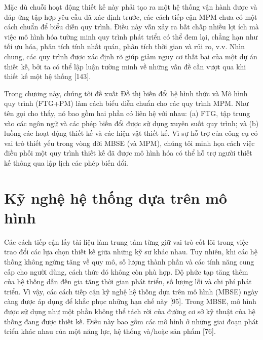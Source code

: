 Mặc dù chuỗi hoạt động thiết kế này phải tạo ra một hệ thống vận hành được và đáp ứng tập hợp yêu cầu đã xác định trước, các cách tiếp cận MPM chưa có một cách chuẩn để biểu diễn quy trình. Điều này vẫn xảy ra bất chấp nhiều lợi ích mà việc mô hình hóa tường minh quy trình phát triển có thể đem lại, chẳng hạn như tối ưu hóa, phân tích tính nhất quán, phân tích thời gian và rủi ro, v.v. Nhìn chung, các quy trình được xác định rõ giúp giảm nguy cơ thất bại của một dự án thiết kế, bởi ta có thể lập luận tường minh về những vấn đề cần vượt qua khi thiết kế một hệ thống [143].

Trong chương này, chúng tôi đề xuất Đồ thị biến đổi hệ hình thức và Mô hình quy trình (FTG+PM) làm cách biểu diễn chuẩn cho các quy trình MPM. Như tên gọi cho thấy, nó bao gồm hai phần có liên hệ với nhau: (a) FTG, tập trung vào các ngôn ngữ và các phép biến đổi được sử dụng xuyên suốt quy trình; và (b) luồng các hoạt động thiết kế và các hiện vật thiết kế. Vì sự hỗ trợ của công cụ có vai trò thiết yếu trong vòng đời MBSE (và MPM), chúng tôi minh họa cách việc điều phối một quy trình thiết kế đã được mô hình hóa có thể hỗ trợ người thiết kế thông qua lập lịch các phép biến đổi.

\section{Kỹ nghệ hệ thống dựa trên mô hình}
Các cách tiếp cận lấy tài liệu làm trung tâm từng giữ vai trò cốt lõi trong việc trao đổi các lựa chọn thiết kế giữa những kỹ sư khác nhau. Tuy nhiên, khi các hệ thống không ngừng tăng về quy mô, số lượng thành phần và các tính năng cung cấp cho người dùng, cách thức đó không còn phù hợp. Độ phức tạp tăng thêm của hệ thống dẫn đến gia tăng thời gian phát triển, số lượng lỗi và chi phí phát triển. Vì vậy, các cách tiếp cận kỹ nghệ hệ thống dựa trên mô hình (MBSE) ngày càng được áp dụng để khắc phục những hạn chế này [95]. Trong MBSE, mô hình được sử dụng như một phần không thể tách rời của đường cơ sở kỹ thuật của hệ thống đang được thiết kế. Điều này bao gồm các mô hình ở những giai đoạn phát triển khác nhau của một năng lực, hệ thống và/hoặc sản phẩm [76].

